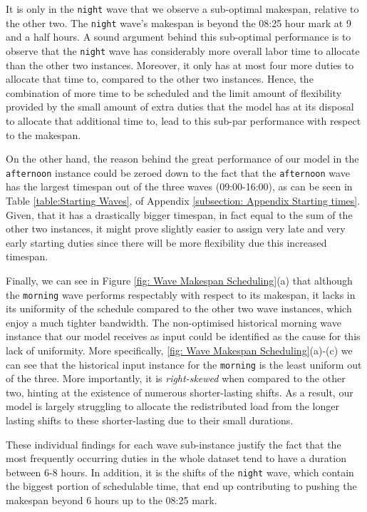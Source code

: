 \vspace{\baselineskip}
\noindent
It is only in the \texttt{night} wave that we observe a sub-optimal makespan, relative to the other two. The \texttt{night} wave's makespan is beyond the 08:25 hour mark at 9 and a half hours. A sound argument behind this sub-optimal performance is to observe that the \texttt{night} wave has considerably more overall labor time to allocate than the other two instances. Moreover, it only has at most four more duties to allocate that time to, compared to the other two instances. Hence, the combination of more time to be scheduled and the limit amount of flexibility provided by the small amount of extra duties that the model has at its disposal to allocate that additional time to, lead to this sub-par performance with respect to the makespan.

\vspace{\baselineskip}
\noindent
On the other hand, the reason behind the great performance of our model in the \texttt{afternoon} instance could be zeroed down to the fact that the \texttt{afternoon} wave has the largest timespan out of the three waves (09:00-16:00), as can be seen in Table \ref{table:Starting Waves}, of Appendix \ref{subsection: Appendix Starting times}. Given, that it has a drastically bigger timespan, in fact equal to the sum of the other two instances, it might prove slightly easier to assign very late and very early starting duties since there will be more flexibility due this increased timespan.

\vspace{\baselineskip}
\noindent
Finally, we can see in Figure \ref{fig: Wave Makespan Scheduling}(a) that although the \texttt{morning} wave performs respectably with respect to its makespan, it lacks in its uniformity of the schedule compared to the other two wave instances, which enjoy a much tighter bandwidth. The non-optimised historical morning wave instance that our model receives as input could be identified as the cause for this lack of uniformity. More specifically, \ref{fig: Wave Makespan Scheduling}(a)-(c) we can see that the historical input instance for the \texttt{morning} is the least uniform out of the three. More importantly, it is \textit{right-skewed} when compared to the other two, hinting at the existence of numerous shorter-lasting shifts. As a result, our model is largely struggling to allocate the redistributed load from the longer lasting shifts to these shorter-lasting due to their small durations.  

\vspace{\baselineskip}
\noindent
These individual findings for each wave sub-instance justify the fact that the most frequently occurring duties in the whole dataset tend to have a duration between 6-8 hours. In addition, it is the shifts of the \texttt{night} wave, which contain the biggest portion of schedulable time, that end up contributing to pushing the makespan beyond 6 hours up to the 08:25 mark. 

